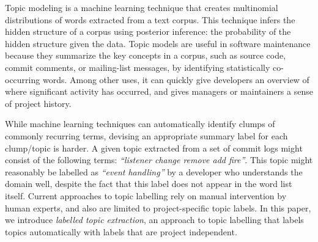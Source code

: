\documentclass[smallextended]{svjour3}       %
\begin{document}
Topic modeling is a machine learning technique that creates
multinomial distributions of words extracted from a text corpus. 
This technique infers the hidden structure of a corpus using posterior
inference: the probability of the hidden structure given the data. 
Topic models are useful in software maintenance because they summarize
the key concepts in a corpus, such as source code, commit comments, or
mailing-list messages, by identifying statistically co-occurring words. 
Among other uses, it can quickly give developers an overview of where significant
activity has occurred, and gives managers or maintainers a sense of
project history. 

While machine learning techniques can automatically identify clumps of
commonly recurring terms, devising an appropriate summary label for
each clump/topic is harder.  
A given topic extracted from a set of commit logs might consist of the following terms: \emph{ ``listener change remove add fire''}. 
This topic might reasonably be labelled as
\emph{``event handling''} by a developer who understands the domain well,
despite the fact that this label does not appear in the word list itself.  
Current approaches to topic labelling rely on manual intervention by
human experts, and also are limited to project-specific topic labels.  
In this paper, we introduce \emph{labelled topic extraction}, an
approach to topic labelling that labels topics automatically with
labels that are project independent.


\end{document}
